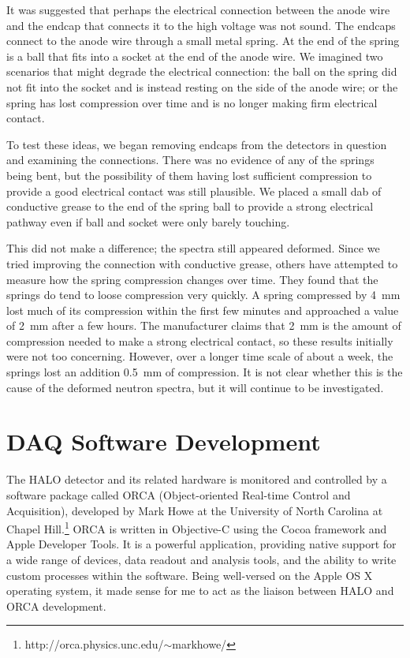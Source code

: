 		It was suggested that perhaps the electrical connection between the anode wire and the endcap that connects it to the high voltage was not sound. The endcaps connect to the anode wire through a small metal spring. At the end of the spring is a ball that fits into a socket at the end of the anode wire. We imagined two scenarios that might degrade the electrical connection: the ball on the spring did not fit into the socket and is instead resting on the side of the anode wire; or the spring has lost compression over time and is no longer making firm electrical contact.

		To test these ideas, we began removing endcaps from the detectors in question and examining the connections. There was no evidence of any of the springs being bent, but the possibility of them having lost sufficient compression to provide a good electrical contact was still plausible. We placed a small dab of conductive grease to the end of the spring ball to provide a strong electrical pathway even if ball and socket were only barely touching. 

		This did not make a difference; the spectra still appeared deformed. Since we tried improving the connection with conductive grease, others have attempted to measure how the spring compression changes over time. They found that the springs do tend to loose compression very quickly. A spring compressed by \SI{4}{\milli\metre} lost much of its compression within the first few minutes and approached a value of \SI{2}{\milli\metre} after a few hours. The manufacturer claims that \SI{2}{\milli\metre} is the amount of compression needed to make a strong electrical contact, so these results initially were not too concerning. However, over a longer time scale of about a week, the springs lost an addition \SI{0.5}{\milli\metre} of compression\cite{spring_test}. It is not clear whether this is the cause of the deformed neutron spectra, but it will continue to be investigated.

	
	\section{DAQ Software Development}
	\label{sec:orca_development}
		The HALO detector and its related hardware is monitored and controlled by a software package called ORCA (Object-oriented Real-time Control and Acquisition), developed by Mark Howe at the University of North Carolina at Chapel Hill.\footnote{http://orca.physics.unc.edu/$\sim$markhowe/} ORCA is written in Objective-C using the Cocoa framework and Apple Developer Tools. It is a powerful application, providing native support for a wide range of devices, data readout and analysis tools, and the ability to write custom processes within the software. Being well-versed on the Apple OS X operating system, it made sense for me to act as the liaison between HALO and ORCA development. 

